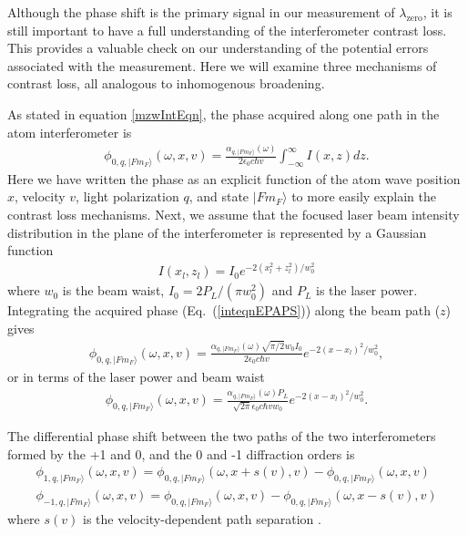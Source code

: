 Although the phase shift is the primary signal in our measurement of $\lambda_\textrm{zero}$, it is still important to have a full understanding of the interferometer contrast loss. This provides a valuable check on our understanding of the potential errors associated with the measurement. Here we will examine three mechanisms of contrast loss, all analogous to inhomogenous broadening.

As stated in equation \ref{mzwIntEqn}, the phase acquired along one path in the atom interferometer is
\begin{eqnarray}
\label{inteqnEPAPS}
\phi_{0,q,|Fm_F\rangle}(\omega,x,v) = \frac{\alpha_{q,|Fm_F\rangle}(\omega)}{2\epsilon_0 c \hbar v}\int_{-\infty}^{\infty}I(x,z) dz.
\end{eqnarray}
Here we have written the phase as an explicit function of the atom wave position $x$, velocity $v$, light polarization $q$, and state $|Fm_F\rangle$ to more easily explain the contrast loss mechanisms. Next, we assume that the focused laser beam intensity distribution in the plane of the interferometer is represented by a Gaussian function
\begin{eqnarray}
\label{intensityEqnEPAPS}
I(x_l,z_l) = I_{0}e^{-2(x_l^2+z_l^2)/w_0^2}
\end{eqnarray}
where $w_0$ is the beam waist, $I_{0}=2P_L/(\pi w_0^2)$ and $P_L$ is the laser power. Integrating the acquired phase (Eq.~(\ref{inteqnEPAPS})) along the beam path ($z$) gives
\begin{eqnarray}
\label{nointeqniEPAPS}
\phi_{0,q,|Fm_F\rangle}(\omega,x,v) = \frac{\alpha_{q,|Fm_F\rangle}(\omega)\sqrt{\pi/2}w_0I_{0}}{2\epsilon_0 c \hbar v}e^{-2(x-x_l)^2/w_0^2},
\end{eqnarray}
or in terms of the laser power and beam waist
\begin{eqnarray}
\label{nointeqnpEPAPS}
\phi_{0,q,|Fm_F\rangle}(\omega,x,v)=\frac{\alpha_{q,|Fm_F\rangle}(\omega)P_L}{\sqrt{2\pi}\epsilon_0 c \hbar v w_0}e^{-2(x-x_l)^2/w_0^2}.
\end{eqnarray}


The differential phase shift between the two paths of the two interferometers formed by the +1 and 0, and the 0 and -1 diffraction orders is
\begin{subequations}
\label{diffPhaseEPAPS}
\begin{eqnarray}
\phi_{1,q,|Fm_F\rangle}(\omega,x,v) = \phi_{0,q,|Fm_F\rangle}(\omega,x+s(v),v)-\phi_{0,q,|Fm_F\rangle}(\omega,x,v)\\
\phi_{-1,q,|Fm_F\rangle}(\omega,x,v) = \phi_{0,q,|Fm_F\rangle}(\omega,x,v)-\phi_{0,q,|Fm_F\rangle}(\omega,x-s(v),v)
\end{eqnarray}
\end{subequations}
where $s(v)$ is the velocity-dependent path separation \cite{Hol10}. 


